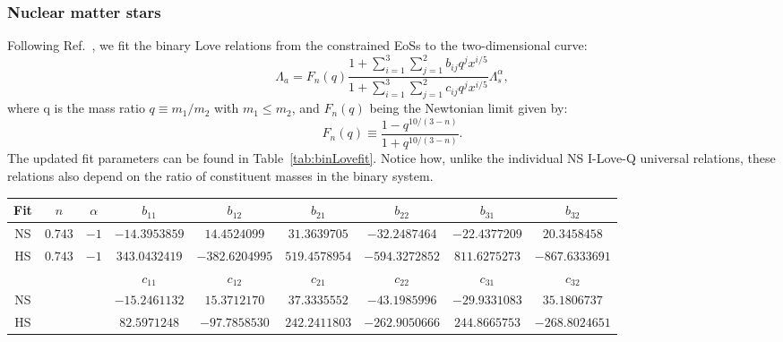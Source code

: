 \documentclass[prd,twocolumn,nofootinbib,superscriptaddress,amsmath,amssymb]{revtex4-1}
\begin{document}
\subsubsection{Nuclear matter stars}\label{sec:binLove-nuclear}
Following Ref.~\cite{Yagi:binLove}, we fit the binary Love relations from the constrained EoSs to the two-dimensional curve:
\begin{equation}\label{eq:binLovefit}
\Lambda_a=F_n(q) \frac{1+ \sum_{i=1}^3 \sum_{j=1}^2 b_{ij}q^j x^{i/5}}{1 + \sum_{i=1}^3 \sum_{j=1}^2 c_{ij}q^j x^{i/5}} \Lambda_s^{\alpha},
\end{equation}
where q is the mass ratio $q \equiv m_1/m_2$ with $m_1 \leq m_2$, and $F_n(q)$ being the Newtonian limit given by:
\begin{equation}
F_n(q) \equiv \frac{1-q^{10/(3-n)}}{1+q^{10/(3-n)}}.
\end{equation}
The updated fit parameters can be found in Table~\ref{tab:binLovefit}.
Notice how, unlike the individual NS I-Love-Q universal relations, these relations also depend on the ratio of constituent masses in the binary system.
\begin{table*}
\centering
\caption{
Updated fit parameters for the binary Love universal relations, as given by the curve found in Eq.~\ref{eq:binLovefit}.
The bottom row corresponds to separate fits corresponding to the hybrid star branch of the hybrid EoSs.
}\label{tab:binLovefit}
\addtolength{\tabcolsep}{1pt} 
\begin{tabular}{c | c  c  c  c  c  c  c  c } 
 \hline
 \hline
 Fit & $n$ & $\alpha$ & $b_{11}$ & $b_{12}$ & $b_{21}$ & $b_{22}$ & $b_{31}$ & $b_{32}$\\
 \hline
 NS & $0.743$ & $-1$ & $-14.3953859$ & $14.4524099$ & $31.3639705$ & $-32.2487464$ & $-22.4377209$ & $20.3458458$\\
 HS & $0.743$ & $-1$ & $343.0432419$ & $-382.6204995$ & $519.4578954$ & $-594.3272852$ & $811.6275273$ & $-867.6333691$\\
\hline
 \hline
 \noalign{\smallskip}

 & & & $c_{11}$ & $c_{12}$ & $c_{21}$ & $c_{22}$ & $c_{31}$ & $c_{32}$\\
 \hline
 NS & & & $-15.2461132$ & $15.3712170$ & $37.3335552$ & $-43.1985996$ & $-29.9331083$ & $35.1806737$\\
 HS & & & $82.5971248$ & $-97.7858530$ & $242.2411803$ & $-262.9050666$ & $244.8665753$ & $-268.8024651$\\
 \hline
 \hline
\end{tabular}
\addtolength{\tabcolsep}{-1pt}
\end{table*}
\end{document}
